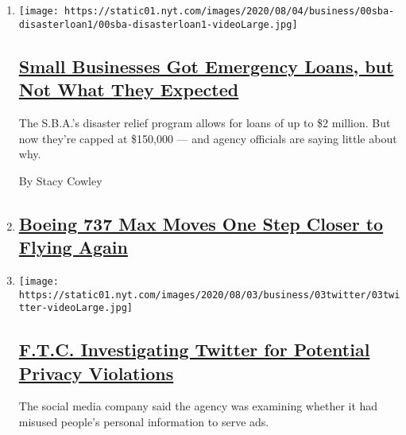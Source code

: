 \begin{enumerate}
\def\labelenumi{\arabic{enumi}.}
\item
  \texttt{[image: https://static01.nyt.com/images/2020/08/04/business/00sba-disasterloan1/00sba-disasterloan1-videoLarge.jpg]}

  \hypertarget{small-businesses-got-emergency-loans-but-not-what-they-expected}{%
  \subsection{\texorpdfstring{\href{/2020/08/03/business/small-business-loans-coronavirus.html}{Small
  Businesses Got Emergency Loans, but Not What They
  Expected}}{Small Businesses Got Emergency Loans, but Not What They Expected}}\label{small-businesses-got-emergency-loans-but-not-what-they-expected}}

  The S.B.A.'s disaster relief program allows for loans of up to \$2
  million. But now they're capped at \$150,000 --- and agency officials
  are saying little about why.

  By Stacy Cowley
\item
  \hypertarget{boeing-737-max-moves-one-step-closer-to-flying-again}{%
  \subsection{\texorpdfstring{\href{https://www.nytimes.com/live/2020/08/03/business/stock-market-today-coronavirus}{Boeing
  737 Max Moves One Step Closer to Flying
  Again}}{Boeing 737 Max Moves One Step Closer to Flying Again}}\label{boeing-737-max-moves-one-step-closer-to-flying-again}}
\item
  \texttt{[image: https://static01.nyt.com/images/2020/08/03/business/03twitter/03twitter-videoLarge.jpg]}

  \hypertarget{ftc-investigating-twitter-for-potential-privacy-violations}{%
  \subsection{\texorpdfstring{\href{/2020/08/03/technology/ftc-twitter-privacy-violations.html}{F.T.C.
  Investigating Twitter for Potential Privacy
  Violations}}{F.T.C. Investigating Twitter for Potential Privacy Violations}}\label{ftc-investigating-twitter-for-potential-privacy-violations}}

  The social media company said the agency was examining whether it had
  misused people's personal information to serve ads.


\end{enumerate}
